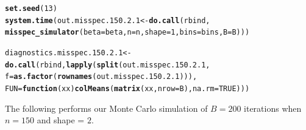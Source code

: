 \documentclass[11pt]{article}\usepackage[]{graphicx}\usepackage[]{color}
\makeatletter
\newcommand{\hlnum}[1]{\textcolor[rgb]{0.686,0.059,0.569}{#1}}%
\newcommand{\hlstd}[1]{\textcolor[rgb]{0.345,0.345,0.345}{#1}}%
\newcommand{\hlkwa}[1]{\textcolor[rgb]{0.161,0.373,0.58}{\textbf{#1}}}%
\newcommand{\hlkwb}[1]{\textcolor[rgb]{0.69,0.353,0.396}{#1}}%
\newcommand{\hlkwc}[1]{\textcolor[rgb]{0.333,0.667,0.333}{#1}}%
\newcommand{\hlkwd}[1]{\textcolor[rgb]{0.737,0.353,0.396}{\textbf{#1}}}%
\newenvironment{kframe}{%
 \def\at@end@of@kframe{}%
 \ifinner\ifhmode%
  \def\at@end@of@kframe{\end{minipage}}%
  \begin{minipage}{\columnwidth}%
 \fi\fi%
 \def\FrameCommand##1{\hskip\@totalleftmargin \hskip-\fboxsep
 \colorbox{shadecolor}{##1}\hskip-\fboxsep
     \hskip-\linewidth \hskip-\@totalleftmargin \hskip\columnwidth}%
 \MakeFramed {\advance\hsize-\width
   \@totalleftmargin\z@ \linewidth\hsize
   \@setminipage}}%
 {\par\unskip\endMakeFramed%
 \at@end@of@kframe}
\newenvironment{knitrout}{}{} %
\makeatother
\begin{document}
\begin{knitrout}
\color{fgcolor}\begin{kframe}
\begin{alltt}
\hlkwd{set.seed}\hlstd{(}\hlnum{13}\hlstd{)}
\hlkwd{system.time}\hlstd{(out.misspec.150.2.1} \hlkwb{<-} \hlkwd{do.call}\hlstd{(rbind,}
  \hlkwd{misspec_simulator}\hlstd{(}\hlkwc{beta} \hlstd{= beta,} \hlkwc{n} \hlstd{= n,} \hlkwc{shape} \hlstd{=} \hlnum{1}\hlstd{,} \hlkwc{bins} \hlstd{= bins,} \hlkwc{B} \hlstd{= B)))}
\end{alltt}


{\ttfamily\noindent\bfseries\color{errorcolor}{\#\# Error in chol.default(crossprod(x) + lambda[j] * diag(v)): the leading minor of order 5 is not positive definite}}

{\ttfamily\noindent\itshape\color{messagecolor}{\#\# Timing stopped at: 0.798 0 0.798}}\begin{alltt}
\hlstd{diagnostics.misspec.150.2.1} \hlkwb{<-} \hlkwd{do.call}\hlstd{(rbind,} \hlkwd{lapply}\hlstd{(}\hlkwd{split}\hlstd{(out.misspec.150.2.1,}
  \hlkwc{f} \hlstd{=} \hlkwd{as.factor}\hlstd{(}\hlkwd{rownames}\hlstd{(out.misspec.150.2.1))),}
  \hlkwc{FUN} \hlstd{=} \hlkwa{function}\hlstd{(}\hlkwc{xx}\hlstd{)} \hlkwd{colMeans}\hlstd{(}\hlkwd{matrix}\hlstd{(xx,} \hlkwc{nrow} \hlstd{= B),} \hlkwc{na.rm} \hlstd{=} \hlnum{TRUE}\hlstd{)))}
\end{alltt}


{\ttfamily\noindent\bfseries\color{errorcolor}{\#\# Error in split(out.misspec.150.2.1, f = as.factor(rownames(out.misspec.150.2.1))): object 'out.misspec.150.2.1' not found}}\end{kframe}
\end{knitrout}


The following performs our Monte Carlo simulation of $B = 200$ iterations 
when $n = 150$ and shape = $2$.
\end{document}
